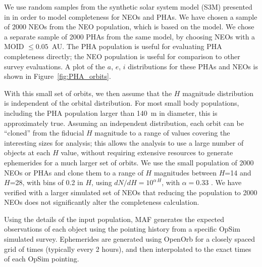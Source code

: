 We use random samples from the synthetic solar system model (S3M) presented in \cite{Grav2011} in order to model completeness for NEOs and PHAs. We have chosen a sample of 2000 NEOs from the \cite{Grav2011} NEO population, which is based on the \cite{Bottke2002} model. We chose a separate sample of 2000 PHAs from the same model, by choosing NEOs with a MOID $\le 0.05$~AU. The PHA population is useful for evaluating PHA completeness directly; the NEO population is useful for comparison to other survey evaluations. A plot of the $a$, $e$, $i$ distributions for these PHAs and NEOs is shown in Figure~\ref{fig:PHA_orbits}.

With this small set of orbits, we then assume that the $H$ magnitude distribution is independent of the orbital distribution.
 For most small body populations, including the PHA population larger than 140~m in diameter, this is approximately true. 
 Assuming an independent distribution, each orbit can be ``cloned'' from the fiducial $H$ magnitude to a range of values 
 covering the interesting sizes for analysis; this allows the analysis to use a large number of objects at each $H$ value, without 
 requiring extensive resources to generate ephemerides for a much larger set of orbits. We use the small population of 
 2000 NEOs or PHAs and clone them to a range of $H$ magnitudes between $H$=14 and $H$=28, with bins of 0.2 in $H$,
 using $dN/dH = 10^{\alpha\, H}$, with $\alpha=0.33$ \citep{2017Icar..284..114S}. We have verified with a larger simulated set 
 of NEOs that reducing the population to 2000 NEOs does not significantly alter the completeness calculation.

Using the details of the input population, MAF generates the expected observations of each object using the pointing history
from a specific OpSim simulated survey. Ephemerides are generated using OpenOrb \citep{OpenOrb2009} for a closely spaced grid of times (typically every 2 hours), and then interpolated to the exact times of each OpSim pointing.


